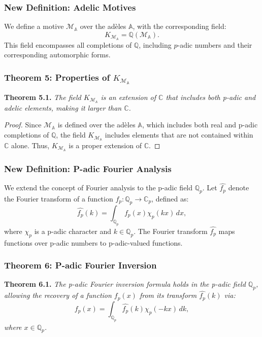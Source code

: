 \documentclass{article}
\begin{document}
\subsubsection{New Definition: Adelic Motives}
We define a motive \(\mathcal{M}_{\mathbb{A}}\) over the adèles \(\mathbb{A}\), with the corresponding field:
\[
K_{\mathcal{M}_{\mathbb{A}}} = \mathbb{Q}(\mathcal{M}_{\mathbb{A}}).
\]
This field encompasses all completions of \(\mathbb{Q}\), including \(p\)-adic numbers and their corresponding automorphic forms.

\subsubsection{Theorem 5: Properties of \(K_{\mathcal{M}_{\mathbb{A}}}\)}
\textbf{Theorem 5.1.} \textit{The field \(K_{\mathcal{M}_{\mathbb{A}}}\) is an extension of \(\mathbb{C}\) that includes both p-adic and adelic elements, making it larger than \(\mathbb{C}\).}

\begin{proof}
Since \(\mathcal{M}_{\mathbb{A}}\) is defined over the adèles \(\mathbb{A}\), which includes both real and p-adic completions of \(\mathbb{Q}\), the field \(K_{\mathcal{M}_{\mathbb{A}}}\) includes elements that are not contained within \(\mathbb{C}\) alone. Thus, \(K_{\mathcal{M}_{\mathbb{A}}}\) is a proper extension of \(\mathbb{C}\).
\end{proof}

\subsubsection{New Definition: P-adic Fourier Analysis}
We extend the concept of Fourier analysis to the p-adic field \(\mathbb{Q}_p\). Let \(\widehat{f_p}\) denote the Fourier transform of a function \(f_p: \mathbb{Q}_p \to \mathbb{C}_p\), defined as:
\[
\widehat{f_p}(k) = \int_{\mathbb{Q}_p} f_p(x) \chi_p(kx) \, dx,
\]
where \(\chi_p\) is a p-adic character and \(k \in \mathbb{Q}_p\). The Fourier transform \(\widehat{f_p}\) maps functions over p-adic numbers to p-adic-valued functions.

\subsubsection{Theorem 6: P-adic Fourier Inversion}
\textbf{Theorem 6.1.} \textit{The p-adic Fourier inversion formula holds in the p-adic field \(\mathbb{Q}_p\), allowing the recovery of a function \(f_p(x)\) from its transform \(\widehat{f_p}(k)\) via:
\[
f_p(x) = \int_{\mathbb{Q}_p} \widehat{f_p}(k) \chi_p(-kx) \, dk,
\]
where \(x \in \mathbb{Q}_p\).}
\end{document}
